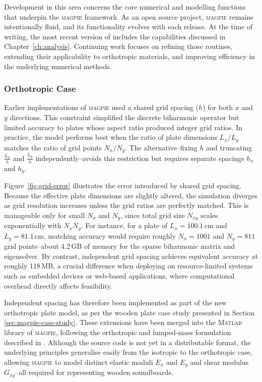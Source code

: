 Development in this area concerns the core numerical and modelling functions that underpin the \textsc{magpie} framework. As an open source project, \textsc{magpie} remains intentionally fluid, and its functionality evolves with each release. At the time of writing, the most recent version of  includes the capabilities discussed in Chapter~\ref{ch:analysis}. Continuing work focuses on refining those routines, extending their applicability to orthotropic materials, and improving efficiency in the underlying numerical methods.

\subsubsection{Orthotropic Case}

Earlier implementations of \textsc{magpie} used a shared grid spacing ($h$) for both $x$ and $y$ directions. This constraint simplified the discrete biharmonic operator but limited accuracy to plates whose aspect ratio produced integer grid ratios. In practice, the model performs best when the ratio of plate dimensions $L_x/L_y$ matches the ratio of grid points $N_x/N_y$. The alternative--fixing $h$ and truncating $\frac{L_x}{h}$ and $\frac{L_y}{h}$ independently--avoids this restriction but requires separate spacings $h_x$ and $h_y$.  


Figure~\ref{fig:grid-error} illustrates the error introduced by shared grid spacing. Because the effective plate dimensions are slightly altered, the simulation diverges as grid resolution increases unless the grid ratios are perfectly matched. This is manageable only for small $N_x$ and $N_y$, since total grid size $N_{xy}$ scales exponentially with $N_x N_y$. For instance, for a plate of $L_x = 100.1$\,cm and $L_y = 81.1$\,cm, matching accuracy would require roughly $N_x = 1001$ and $N_y = 811$ grid points--about 4.2\,GB of memory for the sparse biharmonic matrix and eigensolver. By contrast, independent grid spacing achieves equivalent accuracy at roughly 118\,MB, a crucial difference when deploying on resource-limited systems such as embedded devices or web-based applications, where computational overhead directly affects feasibility.

Independent spacing has therefore been implemented as part of the new orthotropic plate model, as per the wooden plate case study presented in Section \ref{sec:magpie-case-study}. These extensions have been merged into the M\textsc{atlab} library of \textsc{magpie}, following the orthotropic and lumped-mass formulation described in \textcite{ducceschi_open_2024}. Although the source code is not yet in a distributable format, the underlying principles generalise easily from the isotropic to the orthotropic case, allowing \textsc{magpie} to model distinct elastic moduli $E_x$ and $E_y$ and shear modulus $G_{xy}$--all required for representing wooden soundboards.

